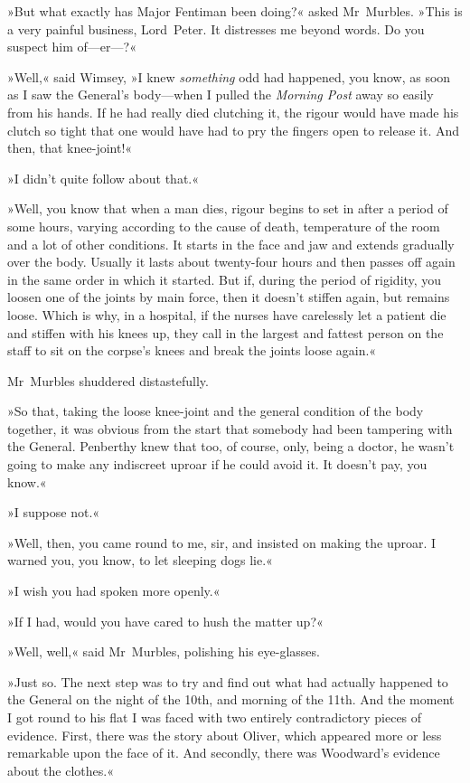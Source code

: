 »But what exactly has Major Fentiman been doing?« asked Mr~Murbles. »This is a very painful business, Lord~Peter. It distresses me beyond words. Do you suspect him of—er—?«

»Well,« said Wimsey, »I knew \textit{something} odd had happened, you know, as soon as I saw the General's body—when I pulled the \textit{Morning Post} away so easily from his hands. If he had really died clutching it, the rigour would have made his clutch so tight that one would have had to pry the fingers open to release it. And then, that knee-joint!«

»I didn't quite follow about that.«

»Well, you know that when a man dies, rigour begins to set in after a period of some hours, varying according to the cause of death, temperature of the room and a lot of other conditions. It starts in the face and jaw and extends gradually over the body. Usually it lasts about twenty-four hours and then passes off again in the same order in which it started. But if, during the period of rigidity, you loosen one of the joints by main force, then it doesn't stiffen again, but remains loose. Which is why, in a hospital, if the nurses have carelessly let a patient die and stiffen with his knees up, they call in the largest and fattest person on the staff to sit on the corpse's knees and break the joints loose again.«

Mr~Murbles shuddered distastefully.

»So that, taking the loose knee-joint and the general condition of the body together, it was obvious from the start that somebody had been tampering with the General. Penberthy knew that too, of course, only, being a doctor, he wasn't going to make any indiscreet uproar if he could avoid it. It doesn't pay, you know.«

»I suppose not.«

»Well, then, you came round to me, sir, and insisted on making the uproar. I warned you, you know, to let sleeping dogs lie.«

»I wish you had spoken more openly.«

»If I had, would you have cared to hush the matter up?«

»Well, well,« said Mr~Murbles, polishing his eye-glasses.

»Just so. The next step was to try and find out what had actually happened to the General on the night of the  10th, and morning of the 11th. And the moment I got round to his flat I was faced with two entirely contradictory pieces of evidence. First, there was the story about Oliver, which appeared more or less remarkable upon the face of it. And secondly, there was Woodward's evidence about the clothes.«

